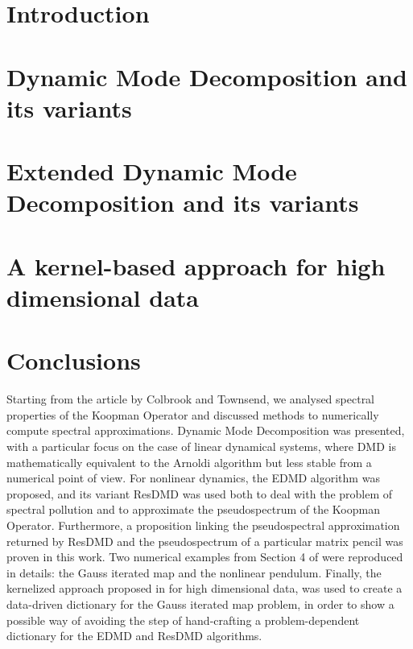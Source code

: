 \documentclass[10pt, a4paper]{report}
\begin{document}
\chapter{Introduction}


\chapter{Dynamic Mode Decomposition and its variants}


\chapter{Extended Dynamic Mode Decomposition and its variants}


\chapter{A kernel-based approach for high dimensional data}


\chapter{Conclusions}
Starting from the article \cite{colbrook_rigorous_2021} by Colbrook and Townsend, we analysed spectral properties of the Koopman Operator and discussed methods to numerically compute spectral approximations. Dynamic Mode Decomposition was presented, with a particular focus on the case of linear dynamical systems, where DMD is mathematically equivalent to the Arnoldi algorithm but less stable from a numerical point of view. For nonlinear dynamics, the EDMD algorithm was proposed, and its variant ResDMD was used both to deal with the problem of spectral pollution and to approximate the pseudospectrum of the Koopman Operator. Furthermore, a proposition linking the pseudospectral approximation returned by ResDMD and the pseudospectrum of a particular matrix pencil was proven in this work. Two numerical examples from Section 4 of \cite{colbrook_rigorous_2021} were reproduced in details: the Gauss iterated map and the nonlinear pendulum. Finally, the kernelized approach proposed in \cite{colbrook_rigorous_2021} for high dimensional data, was used to create a data-driven dictionary for the Gauss iterated map problem, in order to show a possible way of avoiding the step of hand-crafting a problem-dependent dictionary for the EDMD and ResDMD algorithms.

\nocite{*}
\printbibliography
\end{document}
